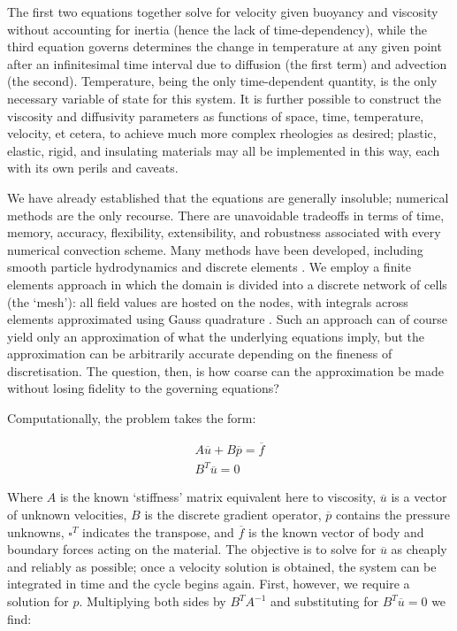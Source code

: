 \documentclass[a4paper,11pt,oneside]{book}
\begin{document}
The first two equations together solve for velocity given buoyancy and viscosity without accounting for inertia (hence the lack of time-dependency), while the third equation governs determines the change in temperature at any given point after an infinitesimal time interval due to diffusion (the first term) and advection (the second). Temperature, being the only time-dependent quantity, is the only necessary variable of state for this system. It is further possible to construct the viscosity and diffusivity parameters as functions of space, time, temperature, velocity, et cetera, to achieve much more complex rheologies as desired; plastic, elastic, rigid, and insulating materials may all be implemented in this way, each with its own perils and caveats.

We have already established that the equations are generally insoluble; numerical methods are the only recourse. There are unavoidable tradeoffs in terms of time, memory, accuracy, flexibility, extensibility, and robustness associated with every numerical convection scheme. Many methods have been developed, including smooth particle hydrodynamics \cite{Monaghan2005-yy} and discrete elements \cite{Cundall1980-hu}. We employ a finite elements approach \cite{Hughes2012-xl} in which the domain is divided into a discrete network of cells (the `mesh'): all field values are hosted on the nodes, with integrals across elements approximated using Gauss quadrature \cite{Swarztrauber2003-mm}. Such an approach can of course yield only an approximation of what the underlying equations imply, but the approximation can be arbitrarily accurate depending on the fineness of discretisation. The question, then, is how coarse can the approximation be made without losing fidelity to the governing equations?

Computationally, the problem takes the form:

\begin{align*}
A \overline{u} + B \overline{p} = \overline{f} \\
B^T \overline{u} = 0
\end{align*}

Where $A$ is the known `stiffness' matrix equivalent here to viscosity, $\overline{u}$ is a vector of unknown velocities, $B$ is the discrete gradient operator, $\overline{p}$ contains the pressure unknowns, $\square^{T}$ indicates the transpose, and $\overline{f}$ is the known vector of body and boundary forces acting on the material. The objective is to solve for $\overline{u}$ as cheaply and reliably as possible; once a velocity solution is obtained, the system can be integrated in time and the cycle begins again. First, however, we require a solution for $p$. Multiplying both sides by $B^TA^{ -1}$ and substituting for $B^T\overline{u}=0$ we find:
\end{document}
